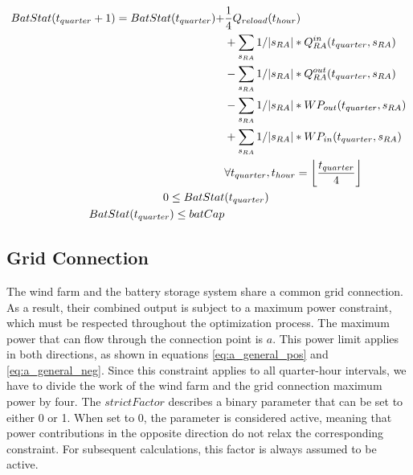 \begin{alignat}{3}
	BatStat(t_{quarter} + 1)  = BatStat(t_{quarter}) + & \frac{1}{4} Q_{reload}(t_{hour})\notag                                                               \\
	                                                   & +\sum_{s_{RA}}1/|s_{RA}|  * Q^{in}_{RA}(t_{quarter}, s_{RA})\notag                                   \\
	                                                   & - \sum_{s_{RA}}1/|s_{RA}|  * Q^{out}_{RA}(t_{quarter}, s_{RA})\notag                                 \\
	                                                   & - \sum_{s_{RA}}1/|s_{RA}|  * WP_{out}(t_{quarter}, s_{RA})\notag                                     \\
	                                                   & + \sum_{s_{RA}}1/|s_{RA}|  * WP_{in}(t_{quarter}, s_{RA})\notag                                      \\
	                                                   & \forall t_{quarter}, t_{hour} = \left\lfloor \frac{t_{quarter}}{4} \right\rfloor  \label{eq:BatStat} \\
	0 \leq  BatStat                                    & (t_{quarter}) 			\label{eq:BatStat_nonNeg}                                                           \\
	BatStat(t_{quarter}) \leq  batCap                  & \label{eq:BatStat_cap}
\end{alignat}


\subsection{Grid Connection}
The wind farm and the battery storage system
share a common grid connection. As a result, their combined output is subject to
a maximum power constraint, which must be respected throughout the optimization process.
The maximum power that can flow through the connection point is $a$. This power limit applies in both directions,
as shown in equations \ref{eq:a_general_pos} and \ref{eq:a_general_neg}. Since this constraint applies to all quarter-hour
intervals, we have to divide the work of the wind farm and the grid connection maximum power by four. The $strictFactor$ describes a binary parameter
that can be set to either 0 or 1.
When set to 0, the parameter is considered active,
meaning that power contributions in the opposite direction
do not relax the corresponding constraint.
For subsequent calculations, this factor is always assumed to be active.

